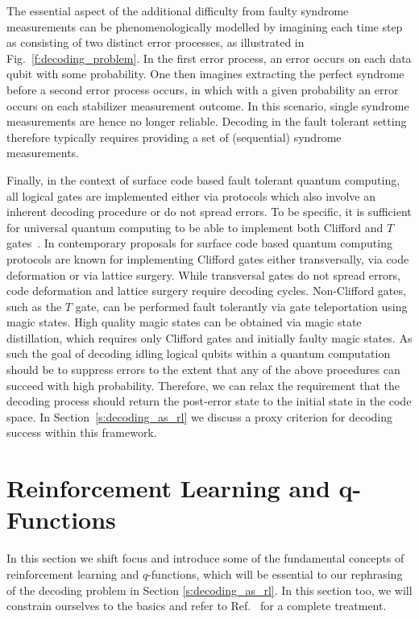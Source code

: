 \documentclass[twocolumn,preprintnumbers,amsmath,amssymb,notitlepage,nofootinbib,longbibliography,superscriptaddress,aps,pra,10pt]{revtex4-1}
\begin{document}
	The essential aspect of the additional difficulty from faulty syndrome measurements can be phenomenologically modelled by imagining each time step as consisting
	of two distinct error processes, as illustrated in Fig.~\ref{f:decoding_problem}. In the first error process, an error occurs on each data qubit with some probability.
	One then imagines extracting the perfect syndrome before a second error process occurs, in which with a given probability an error occurs on each stabilizer measurement outcome.
	In this scenario, single syndrome measurements are hence no longer reliable. Decoding in the fault tolerant setting therefore typically requires providing a set of (sequential) syndrome
	measurements.

	Finally, in the context of surface code based fault tolerant quantum computing, all logical gates are implemented either via protocols which also involve an inherent
	decoding procedure or do not spread errors.
	To be specific, it is sufficient for universal quantum computing to be able to implement both Clifford and $T$ gates~\cite{todo}.
	In contemporary proposals for surface code based quantum computing protocols are known for implementing Clifford gates either transversally, via code deformation or via lattice surgery.
	While transversal gates do not spread errors, code deformation and lattice surgery require decoding cycles.
	Non-Clifford gates, such as the $T$ gate, can be performed fault tolerantly via gate teleportation using magic states.
	High quality magic states can be obtained via magic state distillation, which requires only Clifford gates and initially faulty magic states.
	As such the goal of decoding idling logical qubits within a quantum computation should be to suppress errors to the extent that any of the above procedures can succeed with high probability.
	Therefore, we can relax the requirement that the decoding process should return the post-error state to the initial state in the code space.
	In Section~\ref{s:decoding_as_rl} we discuss a proxy criterion for decoding success within this framework.

\section{Reinforcement Learning and q-Functions}\label{s:reinforcement_learning}

	In this section we shift focus and introduce some of the fundamental concepts of reinforcement learning and $q$-functions, which will be essential to our rephrasing
	of the decoding problem in Section \ref{s:decoding_as_rl}. In this section too, we will constrain ourselves to the basics and refer to Ref.~\cite{BartoSutton} for a complete treatment.
\end{document}
